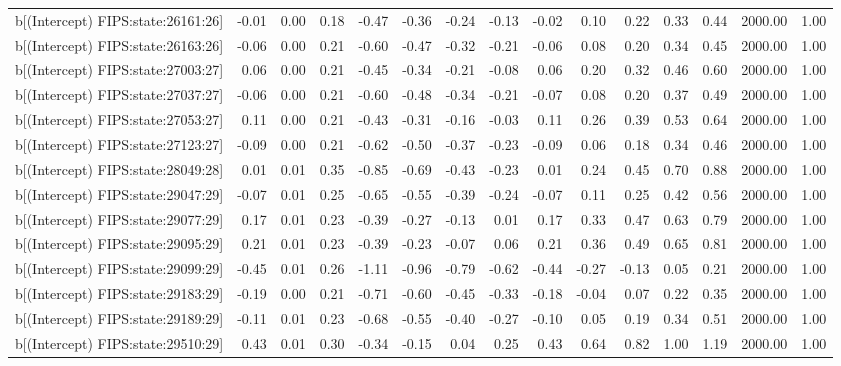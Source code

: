 \begin{table}[ht]
\begin{tabular}{rrrrrrrrrrrrrrr}
  b[(Intercept) FIPS:state:26161:26] & -0.01 & 0.00 & 0.18 & -0.47 & -0.36 & -0.24 & -0.13 & -0.02 & 0.10 & 0.22 & 0.33 & 0.44 & 2000.00 & 1.00 \\ 
  b[(Intercept) FIPS:state:26163:26] & -0.06 & 0.00 & 0.21 & -0.60 & -0.47 & -0.32 & -0.21 & -0.06 & 0.08 & 0.20 & 0.34 & 0.45 & 2000.00 & 1.00 \\ 
  b[(Intercept) FIPS:state:27003:27] & 0.06 & 0.00 & 0.21 & -0.45 & -0.34 & -0.21 & -0.08 & 0.06 & 0.20 & 0.32 & 0.46 & 0.60 & 2000.00 & 1.00 \\ 
  b[(Intercept) FIPS:state:27037:27] & -0.06 & 0.00 & 0.21 & -0.60 & -0.48 & -0.34 & -0.21 & -0.07 & 0.08 & 0.20 & 0.37 & 0.49 & 2000.00 & 1.00 \\ 
  b[(Intercept) FIPS:state:27053:27] & 0.11 & 0.00 & 0.21 & -0.43 & -0.31 & -0.16 & -0.03 & 0.11 & 0.26 & 0.39 & 0.53 & 0.64 & 2000.00 & 1.00 \\ 
  b[(Intercept) FIPS:state:27123:27] & -0.09 & 0.00 & 0.21 & -0.62 & -0.50 & -0.37 & -0.23 & -0.09 & 0.06 & 0.18 & 0.34 & 0.46 & 2000.00 & 1.00 \\ 
  b[(Intercept) FIPS:state:28049:28] & 0.01 & 0.01 & 0.35 & -0.85 & -0.69 & -0.43 & -0.23 & 0.01 & 0.24 & 0.45 & 0.70 & 0.88 & 2000.00 & 1.00 \\ 
  b[(Intercept) FIPS:state:29047:29] & -0.07 & 0.01 & 0.25 & -0.65 & -0.55 & -0.39 & -0.24 & -0.07 & 0.11 & 0.25 & 0.42 & 0.56 & 2000.00 & 1.00 \\ 
  b[(Intercept) FIPS:state:29077:29] & 0.17 & 0.01 & 0.23 & -0.39 & -0.27 & -0.13 & 0.01 & 0.17 & 0.33 & 0.47 & 0.63 & 0.79 & 2000.00 & 1.00 \\ 
  b[(Intercept) FIPS:state:29095:29] & 0.21 & 0.01 & 0.23 & -0.39 & -0.23 & -0.07 & 0.06 & 0.21 & 0.36 & 0.49 & 0.65 & 0.81 & 2000.00 & 1.00 \\ 
  b[(Intercept) FIPS:state:29099:29] & -0.45 & 0.01 & 0.26 & -1.11 & -0.96 & -0.79 & -0.62 & -0.44 & -0.27 & -0.13 & 0.05 & 0.21 & 2000.00 & 1.00 \\ 
  b[(Intercept) FIPS:state:29183:29] & -0.19 & 0.00 & 0.21 & -0.71 & -0.60 & -0.45 & -0.33 & -0.18 & -0.04 & 0.07 & 0.22 & 0.35 & 2000.00 & 1.00 \\ 
  b[(Intercept) FIPS:state:29189:29] & -0.11 & 0.01 & 0.23 & -0.68 & -0.55 & -0.40 & -0.27 & -0.10 & 0.05 & 0.19 & 0.34 & 0.51 & 2000.00 & 1.00 \\ 
  b[(Intercept) FIPS:state:29510:29] & 0.43 & 0.01 & 0.30 & -0.34 & -0.15 & 0.04 & 0.25 & 0.43 & 0.64 & 0.82 & 1.00 & 1.19 & 2000.00 & 1.00 \\ 

\end{tabular}
\end{table}
